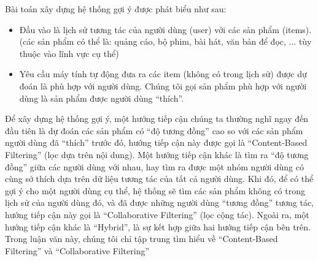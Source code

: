 Bài toán xây dựng hệ thống gợi ý được phát biểu như sau:
\begin{itemize}
    \item Đầu vào là lịch sử tương tác của người dùng (user) với các sản phẩm (items). 
    (các sản phẩm có thể là: quảng cáo, bộ phim, bài hát, văn bản để đọc, ... tùy thuộc vào lĩnh vực cụ thể)
    \item Yêu cầu máy tính tự động đưa ra các item (không có trong lịch sử) được dự đoán là phù hợp với người dùng.
    Chúng tôi gọi sản phẩm phù hợp với người dùng là sản phẩm được người dùng ``thích''.
\end{itemize}
Để xây dựng hệ thống gợi ý, một hướng tiếp cận chúng ta thường nghĩ ngay đến đầu tiên
là dự đoán các sản phẩm có ``độ tương đồng'' cao so với các sản phẩm người dùng đã ``thích'' trước đó,
hướng tiếp cận này được gọi là ``Content-Based Filtering'' (lọc dựa trên nội dung).
Một hướng tiếp cận khác là tìm ra ``độ tương đồng'' giữa các người dùng với nhau, hay tìm ra được một nhóm người dùng
có cùng sở thích dựa trên dữ liệu tương tác của tất cả người dùng. Khi đó, để có thể gợi ý cho một người dùng cụ thể,
hệ thống sẽ tìm các sản phẩm không có trong lịch sử của người dùng đó, và đã được những người dùng ``tương đồng'' tương tác,
hướng tiếp cận này gọi là ``Collaborative Filtering'' (lọc cộng tác).
Ngoài ra, một hướng tiếp cận khác là ``Hybrid'', là sự kết hợp giữa hai hướng tiếp cận bên trên.
Trong luận văn này, chúng tôi chỉ tập trung tìm hiểu về ``Content-Based Filtering'' và  ``Collaborative Filtering''